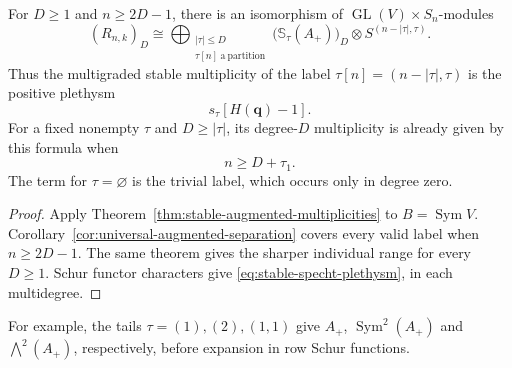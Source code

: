 \begin{corollary}
\label{cor:explicit-stable-specht-multiplicities}
For $D\ge1$ and $n\ge2D-1$, there is an isomorphism of
$\operatorname{GL}(V)\times S_n$-modules
\begin{equation}\label{eq:stable-specht-schur-functor}
 (R_{n,k})_D\cong
 \bigoplus_{\substack{|\tau|\le D\\\tau[n]\ \mathrm{a\ partition}}}
   \bigl(\mathbb S_\tau(A_+)\bigr)_D
       \otimes S^{(n-|\tau|,\tau)}.
\end{equation}
Thus the multigraded stable multiplicity of the label
$\tau[n]=(n-|\tau|,\tau)$ is the positive plethysm
\begin{equation}\label{eq:stable-specht-plethysm}
 s_\tau[H(\mathbf q)-1].
\end{equation}
For a fixed nonempty $\tau$ and
$D\ge|\tau|$, its degree-$D$ multiplicity is
already given by this formula when
\begin{equation}\label{eq:individual-stable-specht-range}
 n\ge D+\tau_1.
\end{equation}
The term for $\tau=\varnothing$ is the trivial label,
which occurs only in degree zero.
\end{corollary}

\begin{proof}
Apply Theorem~\ref{thm:stable-augmented-multiplicities} to
$B=\operatorname{Sym}V$. Corollary~\ref{cor:universal-augmented-separation} covers
every valid label when $n\ge2D-1$. The same theorem gives the sharper individual
range for every $D\ge1$. Schur functor characters give
\eqref{eq:stable-specht-plethysm}, in each multidegree.
\end{proof}

For example, the tails $\tau=(1),(2),(1,1)$ give
$A_+$, $\operatorname{Sym}^2(A_+)$ and $\bigwedge^2(A_+)$,
respectively, before expansion in row Schur functions.


